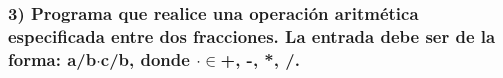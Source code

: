 \subsubsection*{3) Programa que realice una operación aritmética especificada entre dos fracciones. La entrada debe ser de la forma: a/b$\cdot$c/b, donde  $\cdot \in${+, -, *, /}.}